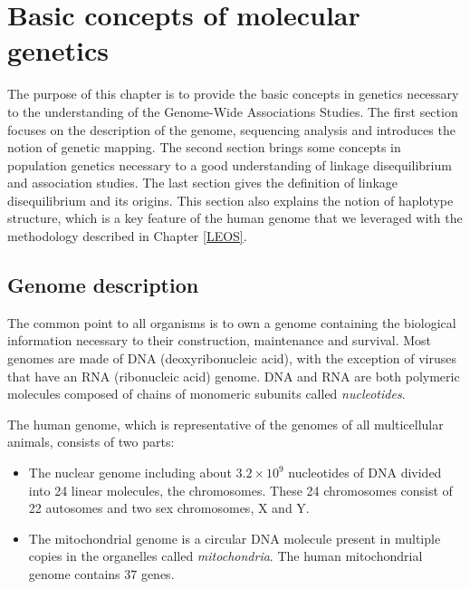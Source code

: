 \documentclass[]{book}
\begin{document}
\hypertarget{genet}{%
\chapter{Basic concepts of molecular genetics}\label{genet}}

The purpose of this chapter is to provide the basic concepts in genetics necessary to the understanding of the Genome-Wide Associations Studies. The first section focuses on the description of the genome, sequencing analysis and introduces the notion of genetic mapping. The second section brings some concepts in population genetics necessary to a good understanding of linkage disequilibrium and association studies. The last section gives the definition of linkage disequilibrium and its origins. This section also explains the notion of haplotype structure, which is a key feature of the human genome that we leveraged with the methodology described in Chapter \ref{LEOS}.

\hypertarget{genome}{%
\section{Genome description}\label{genome}}

The common point to all organisms is to own a genome containing the
biological information necessary to their construction, maintenance and
survival. Most genomes are made of DNA (deoxyribonucleic acid), with the
exception of viruses that have an RNA (ribonucleic acid) genome. DNA and
RNA are both polymeric molecules composed of chains of monomeric
subunits called \emph{nucleotides}.

The human genome, which is representative of the genomes of all
multicellular animals, consists of two parts:

\begin{itemize}
\item
  The nuclear genome including about \(3.2 \times 10^9\) nucleotides of
  DNA divided into 24 linear molecules, the chromosomes. These 24
  chromosomes consist of 22 autosomes and two sex chromosomes, X
  and Y.
\item
  The mitochondrial genome is a circular DNA molecule present in
  multiple copies in the organelles called \emph{mitochondria}. The human
  mitochondrial genome contains 37 genes.
\end{itemize}
\end{document}
